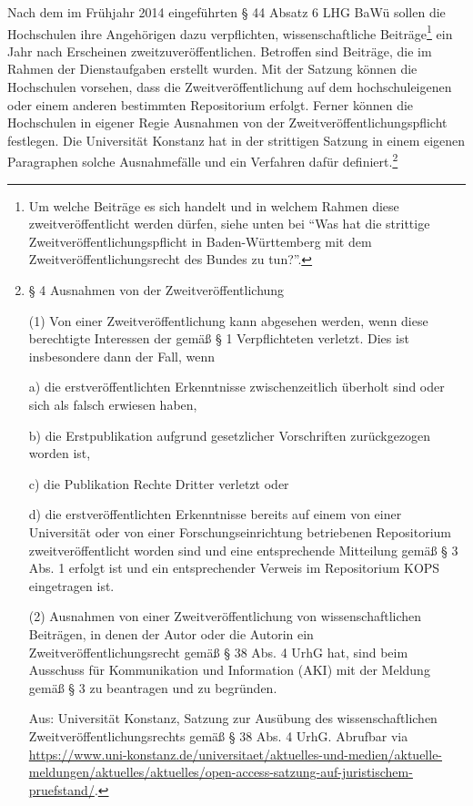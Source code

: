 \documentclass[a4paper,
fontsize=11pt,
oneside,
numbers=noperiodatend,
parskip=half-,
bibliography=totoc,
final
]{scrartcl}
\begin{document}
Nach dem im Frühjahr 2014 eingeführten § 44 Absatz 6 LHG BaWü sollen die
Hochschulen ihre Angehörigen dazu verpflichten, wissenschaftliche
Beiträge\footnote{Um welche Beiträge es sich handelt und in welchem
  Rahmen diese zweitveröffentlicht werden dürfen, siehe unten bei
  \enquote{Was hat die strittige Zweit\-ver\-öffent\-lich\-ungs\-pflicht in
  Baden-Württemberg mit dem Zweit\-ver\-öffent\-lich\-ungs\-recht des Bundes zu
  tun?}.} ein Jahr nach Erscheinen zweitzuveröffentlichen. Betroffen
sind Beiträge, die im Rahmen der Dienstaufgaben erstellt wurden. Mit der
Satzung können die Hochschulen vorsehen, dass die Zweitveröffentlichung
auf dem hochschuleigenen oder einem anderen bestimmten Repositorium
erfolgt. Ferner können die Hochschulen in eigener Regie Ausnahmen von
der Zweit\-ver\-öffent\-lich\-ungs\-pflicht festlegen. Die Universität Konstanz
hat in der strittigen Satzung in einem eigenen Paragraphen solche
Ausnahmefälle und ein Verfahren dafür definiert.\footnote{§ 4 Ausnahmen
  von der Zweitveröffentlichung

  (1) Von einer Zweitveröffentlichung kann abgesehen werden, wenn diese
  berechtigte Interessen der gemäß § 1 Verpflichteten verletzt. Dies ist
  insbesondere dann der Fall, wenn

  a) die erstveröffentlichten Erkenntnisse zwischenzeitlich überholt
  sind oder sich als falsch erwiesen haben,

  b) die Erstpublikation aufgrund gesetzlicher Vorschriften
  zurückgezogen worden ist,

  c) die Publikation Rechte Dritter verletzt oder

  d) die erstveröffentlichten Erkenntnisse bereits auf einem von einer
  Universität oder von einer Forschungseinrichtung betriebenen
  Repositorium zweitveröffentlicht worden sind und eine entsprechende
  Mitteilung gemäß § 3 Abs. 1 erfolgt ist und ein entsprechender Verweis
  im Repositorium KOPS eingetragen ist.

  (2) Ausnahmen von einer Zweitveröffentlichung von wissenschaftlichen
  Beiträgen, in denen der Autor oder die Autorin ein
  Zweit\-ver\-öffent\-lich\-ungs\-recht gemäß § 38 Abs. 4 UrhG hat, sind beim
  Ausschuss für Kommunikation und Information (AKI) mit der Meldung
  gemäß § 3 zu beantragen und zu begründen.

  Aus: Universität Konstanz, Satzung zur Ausübung des wissenschaftlichen
  Zweit\-ver\-öffent\-lich\-ungs\-rechts gemäß § 38 Abs. 4 UrhG. Abrufbar via
  \url{https://www.uni-konstanz.de/universitaet/aktuelles-und-medien/aktuelle-meldungen/aktuelles/aktuelles/open-access-satzung-auf-juristischem-pruefstand/}.}
\end{document}

